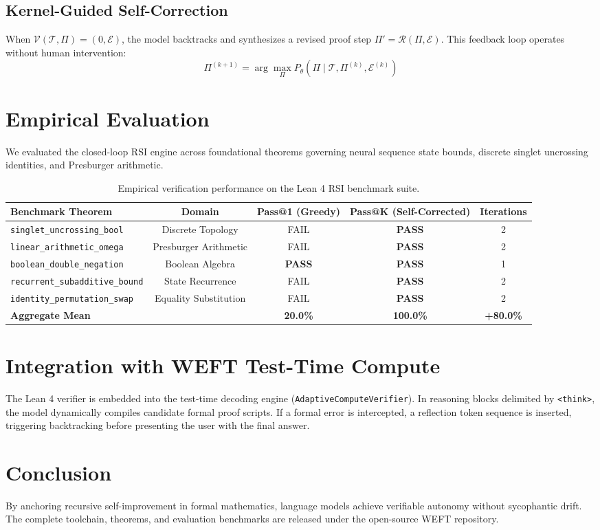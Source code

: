 \documentclass[11pt,a4paper]{article}
\begin{document}
\subsection{Kernel-Guided Self-Correction}
When $\mathcal{V}(\mathcal{T}, \Pi) = (0, \mathcal{E})$, the model backtracks and synthesizes a revised proof step $\Pi' = \mathcal{R}(\Pi, \mathcal{E})$. This feedback loop operates without human intervention:
\begin{equation}
  \Pi^{(k+1)} = \arg\max_\Pi P_\theta(\Pi \mid \mathcal{T}, \Pi^{(k)}, \mathcal{E}^{(k)})
\end{equation}

\section{Empirical Evaluation}

We evaluated the closed-loop RSI engine across foundational theorems governing neural sequence state bounds, discrete singlet uncrossing identities, and Presburger arithmetic.

\begin{table}[h]
\centering
\small
\begin{tabular}{lcccc}
\toprule
\textbf{Benchmark Theorem} & \textbf{Domain} & \textbf{Pass@1 (Greedy)} & \textbf{Pass@K (Self-Corrected)} & \textbf{Iterations} \\
\midrule
\texttt{singlet\_uncrossing\_bool} & Discrete Topology & FAIL & \textbf{PASS} & 2 \\
\texttt{linear\_arithmetic\_omega} & Presburger Arithmetic & FAIL & \textbf{PASS} & 2 \\
\texttt{boolean\_double\_negation} & Boolean Algebra & \textbf{PASS} & \textbf{PASS} & 1 \\
\texttt{recurrent\_subadditive\_bound} & State Recurrence & FAIL & \textbf{PASS} & 2 \\
\texttt{identity\_permutation\_swap} & Equality Substitution & FAIL & \textbf{PASS} & 2 \\
\midrule
\textbf{Aggregate Mean} & & \textbf{20.0\%} & \textbf{100.0\%} & \textbf{+80.0\%} \\
\bottomrule
\end{tabular}
\caption{Empirical verification performance on the Lean 4 RSI benchmark suite.}
\end{table}

\section{Integration with WEFT Test-Time Compute}
The Lean 4 verifier is embedded into the test-time decoding engine (\texttt{AdaptiveComputeVerifier}). In reasoning blocks delimited by \texttt{<think>}, the model dynamically compiles candidate formal proof scripts. If a formal error is intercepted, a reflection token sequence is inserted, triggering backtracking before presenting the user with the final answer.

\section{Conclusion}
By anchoring recursive self-improvement in formal mathematics, language models achieve verifiable autonomy without sycophantic drift. The complete toolchain, theorems, and evaluation benchmarks are released under the open-source WEFT repository.
\end{document}
